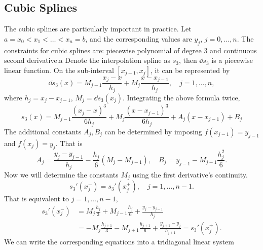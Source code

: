 \subsection{Cubic Splines}
The cubic splines are particularly important in practice. Let $a = x_0 < x_1 <\dots < x_n = b$, and the corresponding values are $y_j$, $j = 0, \dots, n$. The constraints for cubic splines are: piecewise polynomial of degree 3 and continuous second derivative.a Denote the interpolation spline as $s_3$, then $\dd{s_3}$ is a piecewise linear function. On the sub-interval $[x_{j-1}, x_j]$, it can be represented by 
\begin{equation}
    \dd{s_3}(x) = M_{j-1} \frac{x_j - x}{h_j} + M_j \frac{x - x_{j-1}}{h_j},\quad j = 1,\dots, n,
\end{equation}
where $h_j = x_j - x_{j-1}$, $M_j = \dd{s_3}(x_j)$. Integrating the above formula twice, 
\begin{equation}
    s_3(x) = M_{j-1} \frac{(x_j - x)^3}{6 h_j} + M_j \frac{(x - x_{j-1})^3}{6h_j} + A_j (x - x_{j-1}) + B_j
\end{equation}
The additional constants $A_j, B_j$ can be determined by imposing $f(x_{j-1}) = y_{j-1}$ and $f(x_j) = y_j$. That is 
\begin{equation}
    A_j = \frac{y_j - y_{j-1}}{h_j} - \frac{h_j}{6}(M_j - M_{j-1}),\quad 
    B_j = y_{j-1}-  M_{j-1} \frac{h_j^2}{6}.
\end{equation}
Now we will determine the constants $M_j$ using the first derivative's continuity. 
\begin{equation}
    s_3'(x_{j}^{-})  = s_3'(x_j^{+}), \quad j = 1,\dots, n-1.
\end{equation}
That is equivalent to $j=1,\dots, n-1$, 
\begin{equation}
\label{EQ: CUB-SPL-DER}
    \begin{aligned}
        s_3'(x_{j}^{-})  &= M_j\frac{h_j}{3} + M_{j-1}\frac{h_{j}}{6} + \frac{y_j - y_{j-1}}{h_j}  \\
        &= -M_j \frac{h_{j+1}}{3}  - M_{j+1}\frac{h_{j+1}}{6} + \frac{y_{j+1} - y_j}{h_{j+1}} = s_3'(x_j^{+}). 
    \end{aligned}
\end{equation}
We can write the corresponding equations into a tridiagonal linear system 
